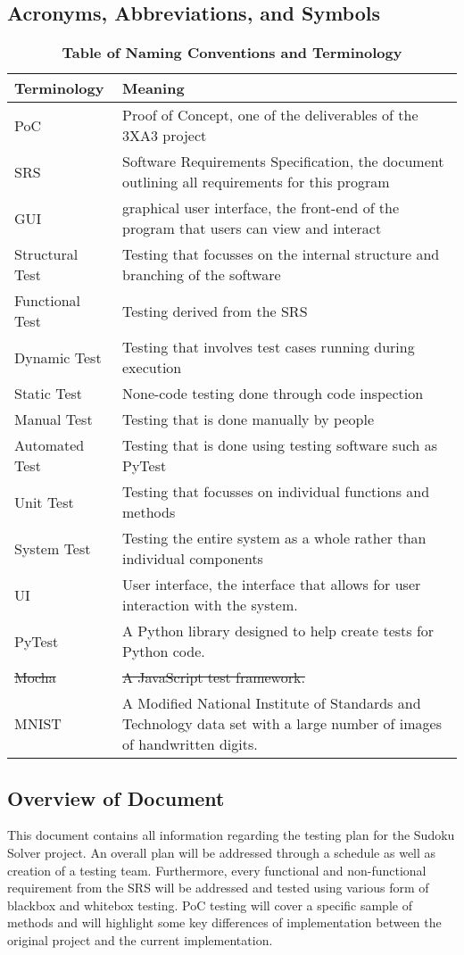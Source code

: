 \documentclass[11pt]{article}
\begin{document}
\subsection{Acronyms, Abbreviations, and Symbols}
\begin{table}[H]
\caption{\bf Table of Naming Conventions and Terminology} \label{Table}
\centering
\begin{tabularx}{\textwidth}{p{3cm}X}
\toprule
Terminology     & Meaning \\
\midrule
PoC & Proof of Concept, one of the deliverables of the 3XA3 project\\
SRS & Software Requirements Specification, the document outlining all requirements for this program\\
GUI & graphical user interface, the front-end of the program that users can view and interact\\
Structural Test & Testing that focusses on the internal structure and branching of the software\\
Functional Test & Testing derived from the SRS\\
Dynamic Test & Testing that involves test cases running during execution\\
Static Test & None-code testing done through code inspection\\
Manual Test & Testing that is done manually by people\\
Automated Test & Testing that is done using testing software such as PyTest\\
Unit Test & Testing that focusses on individual functions and methods\\
System Test & Testing the entire system as a whole rather than individual components\\
UI     & User interface, the interface that allows for user interaction with the system. \\
PyTest & A Python library designed to help create tests for Python code. \\
\sout{Mocha} & \sout{A JavaScript test framework.} \\
MNIST & A Modified National Institute of Standards and Technology data set with a large number of images of handwritten digits.\\
\bottomrule
\end{tabularx}
\end{table}

\subsection{Overview of Document}
This document contains all information regarding the testing plan for the Sudoku Solver project. An overall plan will be addressed through a schedule as well as creation of a testing team. Furthermore, every functional and non-functional requirement from the SRS will be addressed and tested using various form of blackbox and whitebox testing. PoC testing will cover a specific sample of methods and will highlight some key differences of implementation between the original project and the current implementation.
\end{document}
